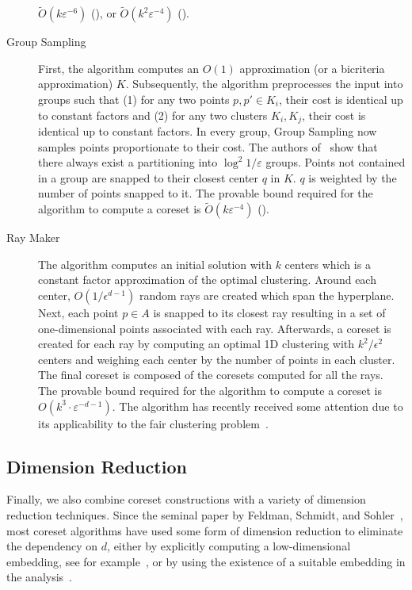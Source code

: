 \begin{description}
$\tilde O\left(k\varepsilon^{-6}\right)$ (\cite{huang2020coresets}), or $\tilde O\left(k^2\varepsilon^{-4}\right)$ (\cite{BravermanJKW21}).
\item[Group Sampling~\cite{Cohen-AddadSS21}] First, the algorithm computes an $O(1)$ approximation (or a bicriteria approximation) $K$. Subsequently, the algorithm preprocesses the input into groups such that (1) for any two points $p,p'\in K_i$, their cost is identical up to constant factors and (2) for any two clusters $K_i,K_j$, their cost is identical up to constant factors. In every group, Group Sampling now samples points proportionate to their cost. The authors of~\cite{Cohen-AddadSS21} show that there always exist a partitioning into $\log^2 1/\varepsilon$ groups. Points not contained in a group are snapped to their closest center $q$ in $K$. $q$ is weighted by the number of points snapped to it. The provable bound required for the algorithm to compute a coreset is $\tilde O\left(k\varepsilon^{-4}\right)$ (\cite{Cohen-AddadSS21}).
\item[Ray Maker~\cite{harpeled2007raymaker}] The algorithm computes an initial solution with $k$ centers which is a constant factor approximation of the optimal clustering. Around each center, $O(1/\epsilon^{d-1})$ random rays are created which span the hyperplane. Next, each point $p \in A$ is snapped to its closest ray resulting in a set of one-dimensional points associated with each ray. Afterwards, a coreset is created for each ray by computing an optimal 1D clustering with $k^2/\epsilon^2$ centers and weighing each center by the number of points in each cluster. The final coreset is composed of the coresets computed for all the rays.
The provable bound required for the algorithm to compute a coreset is $O(k^3 \cdot \varepsilon^{-d-1})$. The algorithm has recently received some attention due to its applicability to the fair clustering problem~\cite{HuangJV19}.
\end{description}

\subsection{Dimension Reduction}
\label{sec:dim_reduction}

Finally, we also combine coreset constructions with a variety of dimension reduction techniques. Since the seminal paper by Feldman, Schmidt, and Sohler~\cite{FSS13}, most coreset algorithms have used some form of dimension reduction to eliminate the dependency on $d$, either by explicitly computing a low-dimensional embedding, see for example~\cite{FSS13,SoW18}, or by using the existence of a suitable embedding in the analysis~\cite{Cohen-AddadSS21,huang2020coresets}.


